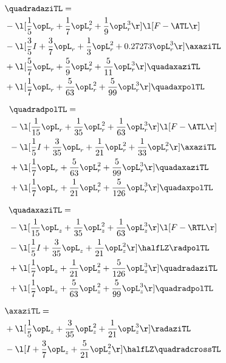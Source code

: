 \begin{alignat}{2} 
\label{eq:quadradaziTL_0} 
& \quadradaziTL = \\ 
& - \l[ \frac{1}{5} \opL_r + \frac{1}{7} \opL_r^{2} + \frac{1}{9} \opL_r^{3}  \r] \l[ F - \ATL \r] \nonumber \\ 
& - \l[ \frac{3}{5} I + \frac{3}{7} \opL_r + \frac{1}{3} \opL_r^{2} +  0.27273 \opL_r^{3}  \r] \axaziTL \nonumber \\ 
& + \l[ \frac{5}{7} \opL_r + \frac{5}{9} \opL_r^{2} + \frac{5}{11} \opL_r^{3}  \r] \quadaxaziTL \nonumber \\ 
& + \l[ \frac{1}{7} \opL_r + \frac{5}{63} \opL_r^{2} + \frac{5}{99} \opL_r^{3}  \r] \quadaxpolTL \nonumber \\ 
\end{alignat} 


\begin{alignat}{2} 
\label{eq:quadradpolTL_0} 
& \quadradpolTL = \\ 
& - \l[ \frac{1}{15} \opL_r + \frac{1}{35} \opL_r^{2} + \frac{1}{63} \opL_r^{3}  \r] \l[ F - \ATL \r] \nonumber \\ 
& - \l[ \frac{1}{5} I + \frac{3}{35} \opL_r + \frac{1}{21} \opL_r^{2} + \frac{1}{33} \opL_r^{2}  \r] \axaziTL \nonumber \\ 
& + \l[ \frac{1}{7} \opL_r + \frac{5}{63} \opL_r^{2} + \frac{5}{99} \opL_r^{3}  \r] \quadaxaziTL \nonumber \\ 
& + \l[ \frac{1}{7} \opL_r + \frac{1}{21} \opL_r^{2} + \frac{5}{126} \opL_r^{3}  \r] \quadaxpolTL \nonumber \\ 
\end{alignat} 


\begin{alignat}{2} 
\label{eq:quadaxaziTL_0} 
& \quadaxaziTL = \\ 
& - \l[ \frac{1}{15} \opL_z + \frac{1}{35} \opL_z^{2} + \frac{1}{63} \opL_z^{3}  \r] \l[ F - \RTL \r] \nonumber \\ 
& - \l[ \frac{1}{5} I + \frac{3}{35} \opL_z + \frac{1}{21} \opL_z^{2}  \r] \halfLZ \radpolTL \nonumber \\ 
& + \l[ \frac{1}{7} \opL_z + \frac{1}{21} \opL_z^{2} + \frac{5}{126} \opL_z^{3}  \r] \quadradaziTL \nonumber \\ 
& + \l[ \frac{1}{7} \opL_z + \frac{5}{63} \opL_z^{2} + \frac{5}{99} \opL_z^{3}  \r] \quadradpolTL \nonumber \\ 
\end{alignat} 


\begin{alignat}{2} 
\label{eq:linaxaziTL_0} 
& \axaziTL = \\ 
& + \l[ \frac{1}{5} \opL_z + \frac{3}{35} \opL_z^{2} + \frac{1}{21} \opL_z^{3}  \r] \radaziTL \nonumber \\ 
& - \l[ I + \frac{3}{7} \opL_z + \frac{5}{21} \opL_z^{2}  \r] \halfLZ \quadradcrossTL \nonumber \\ 
\end{alignat} 



